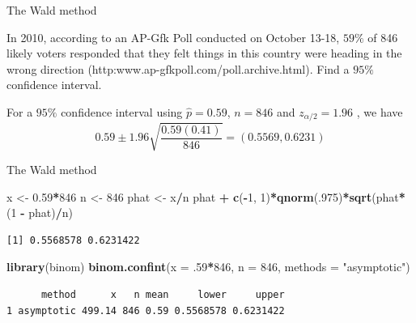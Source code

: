 \documentclass[
  ignorenonframetext,
]{beamer}
\newenvironment{Shaded}{\begin{snugshade}}{\end{snugshade}}
\newcommand{\AttributeTok}[1]{\textcolor[rgb]{0.13,0.29,0.53}{#1}}
\newcommand{\DecValTok}[1]{\textcolor[rgb]{0.00,0.00,0.81}{#1}}
\newcommand{\FloatTok}[1]{\textcolor[rgb]{0.00,0.00,0.81}{#1}}
\newcommand{\FunctionTok}[1]{\textcolor[rgb]{0.13,0.29,0.53}{\textbf{#1}}}
\newcommand{\NormalTok}[1]{#1}
\newcommand{\OtherTok}[1]{\textcolor[rgb]{0.56,0.35,0.01}{#1}}
\newcommand{\SpecialCharTok}[1]{\textcolor[rgb]{0.81,0.36,0.00}{\textbf{#1}}}
\newcommand{\StringTok}[1]{\textcolor[rgb]{0.31,0.60,0.02}{#1}}
\begin{document}
\begin{frame}{The Wald method}
\protect\hypertarget{the-wald-method-1}{}
\begin{tcolorbox}
In 2010, according to an AP-Gfk Poll conducted on October 13-18, $59\%$ of 846 likely voters responded that they felt things in this country were heading in the wrong direction (http:www.ap-gfkpoll.com/poll.archive.html). Find a $95\%$ confidence interval. 
\end{tcolorbox}

\begin{tcolorbox}
For a $95\%$ confidence interval using $\hat{p}=0.59$, $n=846$ and $z_{\alpha/2}=1.96$ , we have
$$0.59\pm 1.96\sqrt{\frac{0.59(0.41)}{846}}=(0.5569,0.6231)$$
\end{tcolorbox}
\end{frame}

\begin{frame}[fragile]{The Wald method}
\protect\hypertarget{the-wald-method-2}{}
\small

\begin{Shaded}
\begin{Highlighting}[]
\NormalTok{x }\OtherTok{\textless{}{-}} \FloatTok{0.59}\SpecialCharTok{*}\DecValTok{846}
\NormalTok{n }\OtherTok{\textless{}{-}} \DecValTok{846}
\NormalTok{phat }\OtherTok{\textless{}{-}}\NormalTok{ x}\SpecialCharTok{/}\NormalTok{n}
\NormalTok{phat }\SpecialCharTok{+} \FunctionTok{c}\NormalTok{(}\SpecialCharTok{{-}}\DecValTok{1}\NormalTok{, }\DecValTok{1}\NormalTok{)}\SpecialCharTok{*}\FunctionTok{qnorm}\NormalTok{(.}\DecValTok{975}\NormalTok{)}\SpecialCharTok{*}\FunctionTok{sqrt}\NormalTok{(phat}\SpecialCharTok{*}\NormalTok{(}\DecValTok{1} \SpecialCharTok{{-}}\NormalTok{ phat)}\SpecialCharTok{/}\NormalTok{n)}
\end{Highlighting}
\end{Shaded}

\begin{verbatim}
[1] 0.5568578 0.6231422
\end{verbatim}

\begin{Shaded}
\begin{Highlighting}[]
\FunctionTok{library}\NormalTok{(binom)}
\FunctionTok{binom.confint}\NormalTok{(}\AttributeTok{x =}\NormalTok{ .}\DecValTok{59}\SpecialCharTok{*}\DecValTok{846}\NormalTok{, }\AttributeTok{n =} \DecValTok{846}\NormalTok{, }\AttributeTok{methods =} \StringTok{"asymptotic"}\NormalTok{)}
\end{Highlighting}
\end{Shaded}

\begin{verbatim}
      method      x   n mean     lower     upper
1 asymptotic 499.14 846 0.59 0.5568578 0.6231422
\end{verbatim}

\normalsize
\end{frame}
\end{document}
